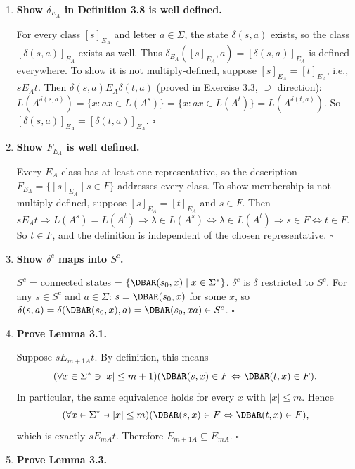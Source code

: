\begin{enumerate}[{3.}1.]
\item \textbf{Show $\delta_{E_A}$ in Definition 3.8 is well defined.}

For every class $[s]_{E_A}$ and letter $a\in\Sigma$, the state $\delta(s,a)$ exists, so the class $[\delta(s,a)]_{E_A}$ exists as well. Thus $\delta_{E_A}([s]_{E_A},a)=[\delta(s,a)]_{E_A}$ is defined everywhere. To show it is not multiply-defined, suppose $[s]_{E_A}=[t]_{E_A}$, i.e., $s E_A t$. Then $\delta(s,a) E_A \delta(t,a)$ (proved in Exercise 3.3, $\supseteq$ direction): $L(A^{\delta(s,a)})=\{x:ax\in L(A^s)\}=\{x:ax\in L(A^t)\}=L(A^{\delta(t,a)})$. So $[\delta(s,a)]_{E_A}=[\delta(t,a)]_{E_A}$. $\square$

\item \textbf{Show $F_{E_A}$ is well defined.}

Every $E_A$-class has at least one representative, so the description $F_{E_A}=\{[s]_{E_A}\mid s\in F\}$ addresses every class. To show membership is not multiply-defined, suppose $[s]_{E_A}=[t]_{E_A}$ and $s\in F$. Then $s E_A t\Rightarrow L(A^s)=L(A^t)\Rightarrow\lambda\in L(A^s)\Leftrightarrow\lambda\in L(A^t)\Rightarrow s\in F\Leftrightarrow t\in F$. So $t\in F$, and the definition is independent of the chosen representative. $\square$

\item \textbf{Show $\delta^c$ maps into $S^c$.}

$S^c$ = connected states = $\{\DBAR(s_0,x)\mid x\in\Sigma^*\}$. $\delta^c$ is $\delta$ restricted to $S^c$. For any $s\in S^c$ and $a\in\Sigma$: $s=\DBAR(s_0,x)$ for some $x$, so $\delta(s,a)=\delta(\DBAR(s_0,x),a)=\DBAR(s_0,xa)\in S^c$. $\square$

\item \textbf{Prove Lemma 3.1.}

Suppose $sE_{m+1A}t$. By definition, this means
\[
(\forall x\in\Sigma^* \ni |x|\leq m+1)(\DBAR(s,x)\in F \Leftrightarrow \DBAR(t,x)\in F).
\]
In particular, the same equivalence holds for every $x$ with $|x|\leq m$. Hence
\[
(\forall x\in\Sigma^* \ni |x|\leq m)(\DBAR(s,x)\in F \Leftrightarrow \DBAR(t,x)\in F),
\]
which is exactly $sE_{mA}t$. Therefore $E_{m+1A}\subseteq E_{mA}$. $\square$

\item \textbf{Prove Lemma 3.3.}


\end{enumerate}
